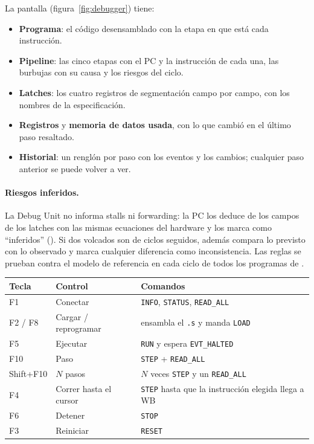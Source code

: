 La pantalla (figura~\ref{fig:debugger}) tiene:
\begin{itemize}[nosep]
  \item \textbf{Programa}: el código desensamblado con la etapa en que está cada instrucción.
  \item \textbf{Pipeline}: las cinco etapas con el PC y la instrucción de cada una, las burbujas
        con su causa y los riesgos del ciclo.
  \item \textbf{Latches}: los cuatro registros de segmentación campo por campo, con los nombres de
        la especificación.
  \item \textbf{Registros} y \textbf{memoria de datos usada}, con lo que cambió en el último paso
        resaltado.
  \item \textbf{Historial}: un renglón por paso con los eventos y los cambios; cualquier paso
        anterior se puede volver a ver.
\end{itemize}

\paragraph{Riesgos inferidos.} La Debug Unit no informa stalls ni forwarding: la PC los deduce de
los campos de los latches con las mismas ecuaciones del hardware y los marca como ``inferidos''
(). Si dos volcados son de ciclos seguidos, además compara lo previsto con lo
observado y marca cualquier diferencia como inconsistencia. Las reglas se prueban contra el modelo
de referencia en cada ciclo de todos los programas de .

\begin{center}
\small
\begin{tabular}{@{}l l l@{}}
  \toprule
  \textbf{Tecla} & \textbf{Control} & \textbf{Comandos} \\
  \midrule
  F1          & Conectar               & \texttt{INFO}, \texttt{STATUS}, \texttt{READ\_ALL} \\
  F2 / F8     & Cargar / reprogramar   & ensambla el \texttt{.s} y manda \texttt{LOAD} \\
  F5          & Ejecutar               & \texttt{RUN} y espera \texttt{EVT\_HALTED} \\
  F10         & Paso                   & \texttt{STEP} + \texttt{READ\_ALL} \\
  Shift+F10   & $N$ pasos              & $N$ veces \texttt{STEP} y un \texttt{READ\_ALL} \\
  F4          & Correr hasta el cursor & \texttt{STEP} hasta que la instrucción elegida llega a WB \\
  F6          & Detener                & \texttt{STOP} \\
  F3          & Reiniciar              & \texttt{RESET} \\
  \bottomrule
\end{tabular}
\end{center}

